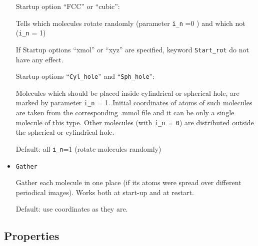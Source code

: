 \documentclass{article}
\begin{document}
\begin{itemize}
Startup option ``FCC'' or ``cubic'':

Tells which molecules rotate randomly (parameter \verb|i_n| =0 ) and 
which not  (\verb|i_n| = 1)


If Startup options ``xmol'' or ``xyz'' are specified, keyword
\verb|Start_rot| do not have any effect.

Startup options ``\verb|Cyl_hole|'' and ``\verb|Sph_hole|'':

Molecules which should be placed inside cylindrical or spherical hole,
are marked by parameter \verb|i_n| = 1. Initial coordinates of atoms of such 
molecules are taken from the corresponding .mmol file and it can be only
a single molecule of this type. Other molecules (with \verb|i_n = 0|) are 
distributed outside the spherical or cylindrical hole.

Default: all \verb|i_n|=1  (rotate molecules randomly)

\item
\verb|Gather|

Gather each molecule in one place (if its atoms were spread over different 
periodical images). Works both at start-up and at restart.


Default: use coordinates as they are.

\end{itemize}

\subsection{Properties}
\end{document}
